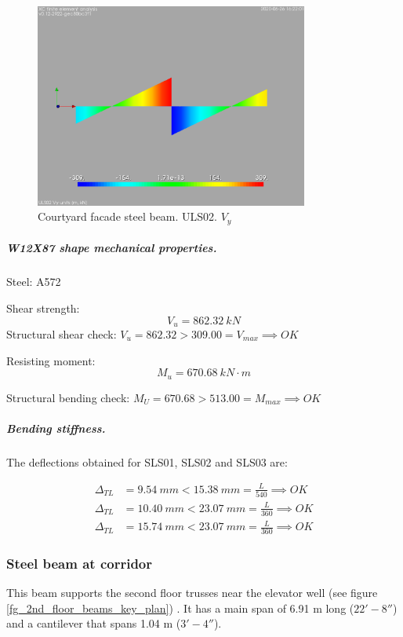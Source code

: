 \begin{figure}
\begin{center}
  \includegraphics[width= 90mm]{figures/courtyard_facade_beam_uls02_vy.png}
\end{center}
\caption{Courtyard facade steel beam. ULS02. $V_y$}
\end{figure}

\subparagraph{W12X87 shape mechanical properties.} Steel: A572

\noindent Shear strength:
\begin{equation}
  V_u= 862.32\ kN 
\end{equation}
\noindent Structural shear check: $V_u = 862.32 > 309.00 = V_{max} \implies OK$

\noindent Resisting moment:
\begin{equation}
  M_u= 670.68\ kN\cdot m
\end{equation}

\noindent Structural bending check: $M_U = 670.68 > 513.00 = M_{max} \implies OK$

\subparagraph{Bending stiffness.}
The deflections obtained for SLS01, SLS02 and SLS03 are:

\begin{align}
  \Delta_{TL} &= 9.54\ mm < 15.38\ mm = \frac{L}{540} \implies OK\\
  \Delta_{TL} &= 10.40\ mm < 23.07\ mm = \frac{L}{360} \implies OK\\
  \Delta_{TL} &= 15.74\ mm < 23.07\ mm = \frac{L}{360} \implies OK
\end{align}

\subsubsection{Steel beam at corridor}
This beam supports the second floor trusses near the elevator well (see figure \ref{fg_2nd_floor_beams_key_plan}) . It has a main span of 6.91 m long ($22' - 8''$)  and a cantilever that spans 1.04 m ($3'-4''$).


